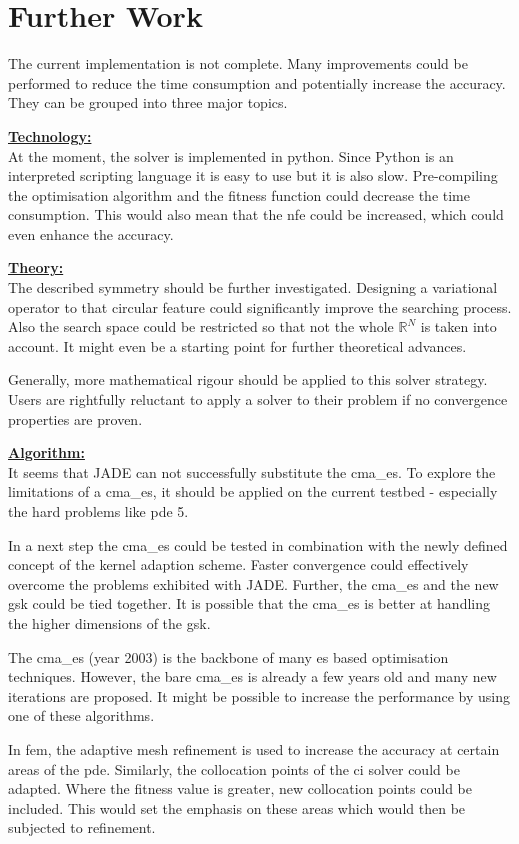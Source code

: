 \documentclass[./\jobname.tex]{subfiles}
\begin{document}
\section{Further Work}

The current implementation is not complete. Many improvements could be performed to reduce the time consumption and potentially increase the accuracy. They can be grouped into three major topics.  

\underline{\textbf{Technology:}} \\
At the moment, the solver is implemented in python. Since Python is an interpreted scripting language it is easy to use but it is also slow. Pre-compiling the optimisation algorithm and the fitness function could decrease the time consumption. This would also mean that the \gls{nfe} could be increased, which could even enhance the accuracy.

\underline{\textbf{Theory:}}\\
The described symmetry should be further investigated. Designing a variational operator to that circular feature could significantly improve the searching process. Also the search space could be restricted so that not the whole $\mathbb{R}^N$ is taken into account. It might even be a starting point for further theoretical advances.

Generally, more mathematical rigour should be applied to this solver strategy. Users are rightfully reluctant to apply a solver to their problem if no convergence properties are proven. 

\underline{\textbf{Algorithm:}}\\
It seems that JADE can not successfully substitute the \gls{cma_es}. To explore the limitations of a \gls{cma_es}, it should be applied on the current testbed - especially the hard problems like \gls{pde} 5. 

In a next step the \gls{cma_es} could be tested in combination with the newly defined concept of the kernel adaption scheme. Faster convergence could effectively overcome the problems exhibited with JADE. Further, the \gls{cma_es} and the new \gls{gsk} could be tied together. It is possible that the \gls{cma_es} is better at handling the higher dimensions of the \gls{gsk}. 

The \gls{cma_es} (year 2003) is the backbone of many \gls{es} based optimisation techniques. However, the bare \gls{cma_es} is already a few years old and many new iterations are proposed. It might be possible to increase the performance by using one of these algorithms. 

In \gls{fem}, the adaptive mesh refinement is used to increase the accuracy at certain areas of the \gls{pde}. Similarly, the collocation points of the \gls{ci} solver could be adapted. Where the fitness value is greater, new collocation points could be included. This would set the emphasis on these areas which would then be subjected to refinement. 
\end{document}
